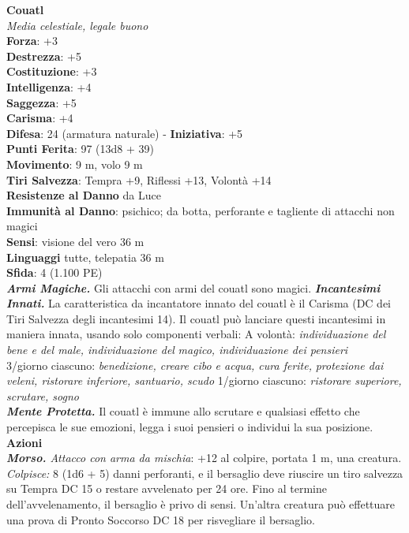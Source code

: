 \begin{multicols}{2}
\medskip\textbf{Couatl}\\
\emph{Media celestiale, legale buono}\\
\textbf{Forza}: +3\\
\textbf{Destrezza}: +5\\
\textbf{Costituzione}: +3\\
\textbf{Intelligenza}: +4\\
\textbf{Saggezza}: +5\\
\textbf{Carisma}: +4\\
\textbf{Difesa}: 24 (armatura naturale) - \textbf{Iniziativa}: +5\\
\textbf{Punti Ferita}: 97 (13d8 + 39)\\
\textbf{Movimento}: 9 m, volo 9 m\\
\textbf{Tiri Salvezza}: Tempra +9, Riflessi +13, Volontà +14\\
\textbf{Resistenze al Danno} da Luce\\
\textbf{Immunità al Danno}: psichico; da botta, perforante e tagliente di attacchi non magici\\
\textbf{Sensi}: visione del vero 36 m\\
\textbf{Linguaggi} tutte, telepatia 36 m \\
\textbf{Sfida}: 4 (1.100 PE)\smallskip\\
\emph{\textbf{Armi Magiche.}} Gli attacchi con armi del couatl sono magici.
\emph{\textbf{Incantesimi Innati.}} La caratteristica da incantatore innato del couatl è il Carisma (DC dei Tiri Salvezza degli incantesimi 14). Il couatl può lanciare questi incantesimi in maniera innata, usando solo componenti verbali:
A volontà: \emph{individuazione del bene e del male, individuazione del} \emph{magico, individuazione dei pensieri}\\
3/giorno ciascuno: \emph{benedizione, creare cibo e acqua, cura ferite,} \emph{protezione dai veleni, ristorare inferiore, santuario, scudo} 1/giorno ciascuno: \emph{ristorare superiore, scrutare, sogno}\\
\emph{\textbf{Mente Protetta.}} Il couatl è immune allo scrutare e qualsiasi effetto che percepisca le sue emozioni, legga i suoi pensieri o individui la sua posizione.\\
\smallskip\textbf{Azioni}\\
\emph{\textbf{Morso.} Attacco con arma da mischia}: +12 al colpire, portata 1 m, una creatura.\\
\emph{Colpisce:} 8 (1d6 + 5) danni perforanti, e il bersaglio deve riuscire un tiro salvezza su Tempra DC  15 o restare avvelenato per 24 ore. Fino al termine dell'avvelenamento, il bersaglio è privo di sensi. Un'altra creatura può effettuare una prova di Pronto Soccorso DC  18 per risvegliare il bersaglio.\\

\end{multicols}
